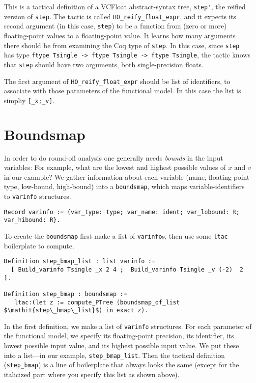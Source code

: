 \documentclass[article]{memoir}
\begin{document}
This is a tactical definition of a VCFloat abstract-syntax tree,
\lstinline{step'}, the reified version of \lstinline{step}.
The tactic is called \lstinline{HO_reify_float_expr},
and it expects its second argument (in this case, \lstinline{step})
to be a function from (zero or more) floating-point values
to a floating-point value.  It learns how many arguments
there should be from examining the Coq type of \lstinline{step}.
In this case, since \lstinline{step} has type
\lstinline{ftype Tsingle -> ftype Tsingle -> ftype Tsingle},
the tactic knows that \lstinline{step} should have
two arguments, both single-precision floats.

The first argument of \lstinline{HO_reify_float_expr}
should be list of identifiers, to associate with those
parameters of the functional model.  In this case the list is
simpliy \lstinline{[_x;_v]}.

\chapter{Boundsmap}

In order to do round-off analysis one generally needs \emph{bounds}
in the input variables:
For example, what are the lowest and highest possible
values of $x$ and $v$ in our example?
We gather information about each variable
(name, floating-point type, low-bound, high-bound) into
a \lstinline{boundsmap}, which maps variable-identifiers to
\lstinline{varinfo} structures.
\begin{lstlisting}
Record varinfo := {var_type: type; var_name: ident; var_lobound: R; var_hibound: R}.
\end{lstlisting}

To create the \lstinline{boundsmap}
first make a list of \lstinline{varinfo}s,
then use some \lstinline{ltac} boilerplate to compute.
\begin{lstlisting}
Definition step_bmap_list : list varinfo := 
  [ Build_varinfo Tsingle _x 2 4 ;  Build_varinfo Tsingle _v (-2)  2 ].

Definition step_bmap : boundsmap :=
   ltac:(let z := compute_PTree (boundsmap_of_list $\mathit{step\_bmap\_list}$) in exact z).
\end{lstlisting}
In the first definition, we make a list of \lstinline{varinfo} structures.
For each parameter of the functional model, we specify its floating-point precision, its identifier, its lowest possible input value,
and its highest possible input value.  
We put these into a list---in our example, \lstinline{step_bmap_list}.
Then the tactical definition (\lstinline{step_bmap}) is
a line of boilerplate that always looks the same
(except for the italicized part where you specify this list
as shown above).
\end{document}
